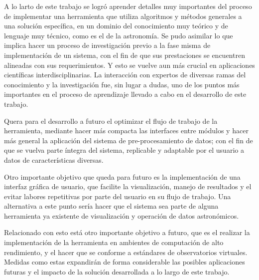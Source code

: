 \begin{conclusion}
A lo larto de este trabajo se logró aprender detalles muy importantes del proceso de implementar una herramienta que utiliza algoritmos y métodos generales a una solución específica, en un dominio del conocimiento muy teórico y de lenguaje muy técnico, como es el de la astronomía. Se pudo asimilar lo que implica hacer un proceso de investigación previo a la fase misma de implementación de un sistema, con el fin de que sus prestaciones se encuentren alineadas con sus requerimientos. Y esto se vuelve aun más crucial en aplicaciones científicas interdisciplinarias. La interacción con expertos de diversas ramas del conocimiento y la investigación fue, sin lugar a dudas, uno de los puntos más importantes en el proceso de aprendizaje llevado a cabo en el desarrollo de este trabajo.

Quera para el desarrollo a futuro el optimizar el flujo de trabajo de la herramienta, mediante hacer más compacta las interfaces entre módulos y hacer más general la aplicación del sistema de pre-procesamiento de datos; con el fin de que se vuelva parte íntegra del sistema, replicable y adaptable por el usuario a datos de características diversas. 

Otro importante objetivo que queda para futuro es la implementación de una interfaz gráfica de usuario, que facilite la visualización, manejo de resultados y el evitar labores repetitivas por parte del usuario en su flujo de trabajo. Una alternativa a este punto sería hacer que el sistema sea parte de alguna herramienta ya existente de visualización y operación de datos astronómicos.

Relacionado con esto está otro importante objetivo a futuro, que es el realizar la implementación de la herramienta en ambientes de computación de alto rendimiento, y el hacer que se conforme a estándares de observatorios virtuales. Medidas como estas expandirán de forma considerable las posibles aplicaciones futuras y el impacto de la solución desarrollada a lo largo de este trabajo.

\end{conclusion}